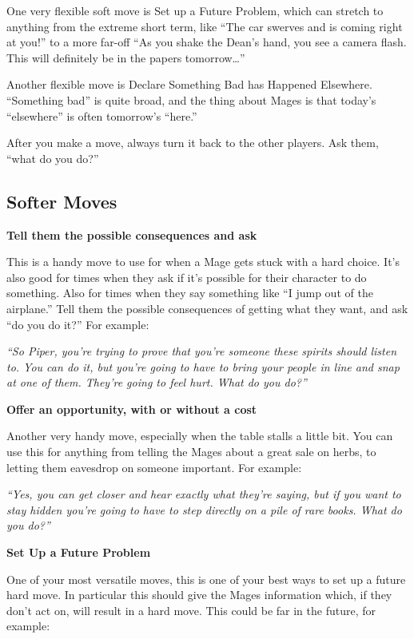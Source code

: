 \documentclass[
  oneside,
  statementpaper,
  9pt]{memoir}
\begin{document}
One very flexible soft move is Set up a Future Problem, which can
stretch to anything from the extreme short term, like ``The car swerves
and is coming right at you!'' to a more far-off ``As you shake the
Dean's hand, you see a camera flash. This will definitely be in the
papers tomorrow\ldots{}''

Another flexible move is Declare Something Bad has Happened Elsewhere.
``Something bad'' is quite broad, and the thing about Mages is that
today's ``elsewhere'' is often tomorrow's ``here.''

After you make a move, always turn it back to the other players. Ask
them, ``what do you do?''

\hypertarget{softer-moves}{%
\subsection{Softer Moves}\label{softer-moves}}

\textbf{Tell them the possible consequences and ask}

This is a handy move to use for when a Mage gets stuck with a hard
choice. It's also good for times when they ask if it's possible for
their character to do something. Also for times when they say something
like ``I jump out of the airplane.'' Tell them the possible consequences
of getting what they want, and ask ``do you do it?'' For example:

\emph{``So Piper, you're trying to prove that you're someone these
spirits should listen to. You can do it, but you're going to have to
bring your people in line and snap at one of them. They're going to feel
hurt. What do you do?''}

\textbf{Offer an opportunity, with or without a cost}

Another very handy move, especially when the table stalls a little bit.
You can use this for anything from telling the Mages about a great sale
on herbs, to letting them eavesdrop on someone important. For example:

\emph{``Yes, you can get closer and hear exactly what they're saying,
but if you want to stay hidden you're going to have to step directly on
a pile of rare books. What do you do?''}

\textbf{Set Up a Future Problem}

One of your most versatile moves, this is one of your best ways to set
up a future hard move. In particular this should give the Mages
information which, if they don't act on, will result in a hard move.
This could be far in the future, for example:
\end{document}
